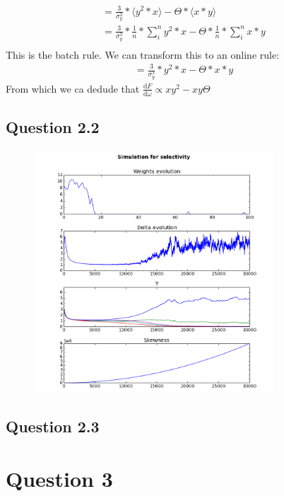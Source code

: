 \begin{align*}
	= \frac{3}{\sigma_y^3} * \langle y^2 * x \rangle - \Theta * \langle x * y \rangle \\
	= \frac{3}{\sigma_y^3} * \frac{1}{n} * \sum_{i}^{n} y^2*x - \Theta * \frac{1}{n} * \sum_{i}^{n} x * y \\
\end{align*}
This is the batch rule. We can transform this to an online rule:
\begin{align*}
	= \frac{3}{\sigma_y^3} * y^2*x - \Theta * x * y
\end{align*}
From which we ca dedude that $\frac{\mathrm{d}F}{\mathrm{d}\omega} \propto x y^2 - x y\Theta$

\subsection{Question 2.2}

\begin{figure}[H]
 \centering
 \includegraphics[width = 0.8\textwidth]{../results/exercise22}
 \caption{}
 \label{fig:bild1}
\end{figure}

\subsection{Question 2.3}


\section{Question 3}

